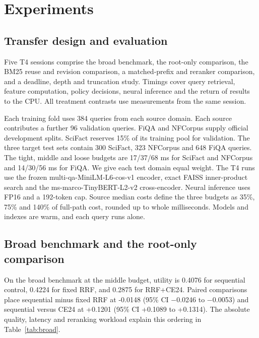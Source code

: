 \documentclass{article}
\newcommand{\widetable}[1]{\begingroup\setlength{\tabcolsep}{2.6pt}\endgroup}
\begin{document}
\section{Experiments}
\subsection{Transfer design and evaluation}
Five T4 sessions comprise the broad benchmark, the root-only comparison, the BM25 reuse and revision comparison, a matched-prefix and reranker comparison, and a deadline, depth and truncation study. Timings cover query retrieval, feature computation, policy decisions, neural inference and the return of results to the CPU. All treatment contrasts use measurements from the same session.

Each training fold uses 384 queries from each source domain. Each source contributes a further 96 validation queries. FiQA and NFCorpus supply official development splits. SciFact reserves 15\% of its training pool for validation. The three target test sets contain 300 SciFact, 323 NFCorpus and 648 FiQA queries. The tight, middle and loose budgets are 17/37/68 ms for SciFact and NFCorpus and 14/30/56 ms for FiQA. We give each test domain equal weight. The T4 runs use the frozen multi-qa-MiniLM-L6-cos-v1 encoder, exact FAISS inner-product search and the ms-marco-TinyBERT-L2-v2 cross-encoder. Neural inference uses FP16 and a 192-token cap. Source median costs define the three budgets as 35\%, 75\% and 140\% of full-path cost, rounded up to whole milliseconds. Models and indexes are warm, and each query runs alone.

\subsection{Broad benchmark and the root-only comparison}
On the broad benchmark at the middle budget, utility is 0.4076 for sequential control, 0.4224 for fixed RRF, and 0.2875 for RRF+CE24. Paired comparisons place sequential minus fixed RRF at -0.0148 (95\% CI $-$0.0246 to $-$0.0053) and sequential versus CE24 at +0.1201 (95\% CI +0.1089 to +0.1314). The absolute quality, latency and reranking workload explain this ordering in Table~\ref{tab:broad}.

\begin{table}[htbp]\centering
\caption{Broad benchmark at the middle budget. Each column is an equal-domain mean. NDCG, recall and MRR use rank 10. Mean and P95 latency are in ms. Pairs counts cross-encoder evaluations per query. Over is the percentage of queries exceeding their own budget.}
\label{tab:broad}\widetable{broad}
\end{table}
\end{document}

